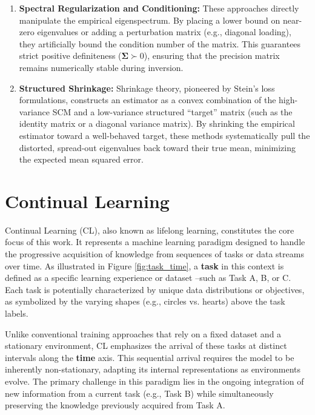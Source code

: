 \begin{enumerate}
	\item \textbf{Spectral Regularization and Conditioning:} These approaches directly manipulate the empirical eigenspectrum. By placing a lower bound on near-zero eigenvalues or adding a perturbation matrix (e.g., diagonal loading), they artificially bound the condition number of the matrix. This guarantees strict positive definiteness ($\boldsymbol{\Sigma} \succ 0$), ensuring that the precision matrix remains numerically stable during inversion.
	
	\item \textbf{Structured Shrinkage:} Shrinkage theory, pioneered by Stein's loss formulations, constructs an estimator as a convex combination of the high-variance SCM and a low-variance structured ``target'' matrix (such as the identity matrix or a diagonal variance matrix). By shrinking the empirical estimator toward a well-behaved target, these methods systematically pull the distorted, spread-out eigenvalues back toward their true mean, minimizing the expected mean squared error.
\end{enumerate}


\section{Continual Learning}

Continual Learning (CL), also known as lifelong learning, constitutes the core focus of this work. It represents a machine learning paradigm designed to handle the progressive acquisition of knowledge from sequences of tasks or data streams over time. As illustrated in Figure \ref{fig:task_time}, a \textbf{task} in this context is defined as a specific learning experience or dataset –such as Task A, B, or C. Each task is potentially characterized by unique data distributions or objectives, as symbolized by the varying shapes (e.g., circles vs. hearts) above the task labels. 

Unlike conventional training approaches that rely on a fixed dataset and a stationary environment, CL emphasizes the arrival of these tasks at distinct intervals along the \textbf{time} axis. This sequential arrival requires the model to be inherently non-stationary, adapting its internal representations as environments evolve. The primary challenge in this paradigm lies in the ongoing integration of new information from a current task (e.g., Task B) while simultaneously preserving the knowledge previously acquired from Task A.

